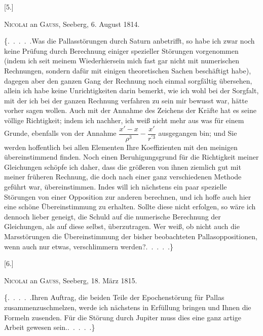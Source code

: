 \clearpage
\begingroup
{}
\renewcommand{\headrulewidth}{0pt}
\par\medskip
{}
\begin{center}
[5.]\par\medskip
\textsc{Nicolai} an \textsc{Gauss}, Seeberg, 6. August 1814.
\end{center}
\par\noindent\hspace*{\parindent}\{.\ .\ .\ .\ .\quad Was die Pallasstörungen durch Saturn anbetrifft, so habe ich
zwar noch keine Prüfung durch Berechnung einiger spezieller Störungen vorgenommen
(indem ich seit meinem Wiederhiersein mich fast gar nicht mit
numerischen Rechnungen, sondern dafür mit einigen theoretischen Sachen beschäftigt
habe), dagegen aber den ganzen Gang der Rechnung noch einmal
sorgfältig übersehen, allein ich habe keine Unrichtigkeiten darin bemerkt, wie
ich wohl bei der Sorgfalt, mit der ich bei der ganzen Rechnung verfahren
zu sein mir bewusst war, hätte vorher sagen wollen. Auch mit der Annahme
des Zeichens der Kräfte hat es seine völlige Richtigkeit; indem ich nachher,
ich weiß nicht mehr aus was für einem Grunde, ebenfalls von der Annahme
\(\dfrac{x'-x}{\rho^3}-\dfrac{x'}{r^{\prime3}}\) ausgegangen bin; und Sie werden hoffentlich bei allen Elementen
Ihre Koeffizienten mit den meinigen übereinstimmend finden. Noch einen
Beruhigungsgrund für die Richtigkeit meiner Gleichungen schöpfe ich daher,
dass die größeren von ihnen ziemlich gut mit meiner früheren Rechnung, die
doch nach einer ganz verschiedenen Methode geführt war, übereinstimmen.
Indes will ich nächstens ein paar spezielle Störungen von einer Opposition
zur anderen berechnen, und ich hoffe auch hier eine schöne Übereinstimmung
zu erhalten. Sollte diese nicht erfolgen, so wäre ich dennoch lieber geneigt,
die Schuld auf die numerische Berechnung der Gleichungen, als auf diese
selbst, überzutragen. Wer weiß, ob nicht auch die Marsstörungen die Übereinstimmung
der bisher beobachteten Pallasoppositionen, wenn auch nur etwas,
verschlimmern werden?\quad .\ .\ .\ .\ .\}

\par\medskip
{}
\begin{center}
[6.]\par\medskip
\textsc{Nicolai} an \textsc{Gauss}, Seeberg, 18. März 1815.
\end{center}
\par\noindent\hspace*{\parindent}\{.\ .\ .\ .\ .\quad Ihren Auftrag, die beiden Teile der Epochenstörung für Pallas
zusammenzuschmelzen, werde ich nächstens in Erfüllung bringen und Ihnen
die Formeln zusenden. Für die Störung durch Jupiter muss dies eine ganz
artige Arbeit gewesen sein.\quad .\ .\ .\ .\ .\}

